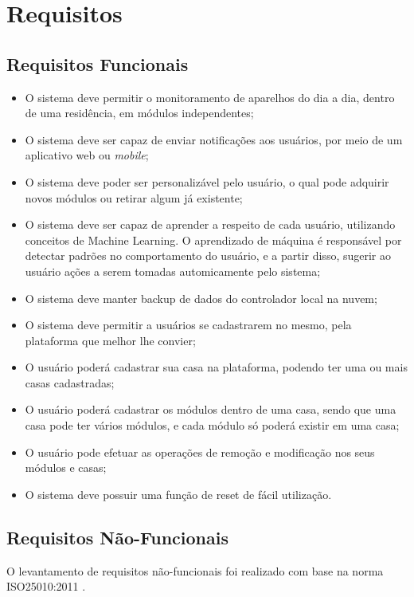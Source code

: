 \section{Requisitos}

\subsection{Requisitos Funcionais}
\begin{itemize}
\item O sistema deve permitir o monitoramento de aparelhos do dia a dia, dentro de uma residência, em módulos independentes;
\item O sistema deve ser capaz de enviar notificações aos usuários, por meio de um aplicativo web ou \textit{mobile};
\item O sistema deve poder ser personalizável pelo usuário, o qual pode adquirir novos módulos ou retirar algum já existente;
\item O sistema deve ser capaz de aprender a respeito de cada usuário, utilizando conceitos de Machine Learning. O aprendizado de máquina é responsável por detectar padrões no comportamento do usuário, e a partir disso, sugerir ao usuário ações a serem tomadas automicamente pelo sistema;
\item O sistema deve manter backup de dados do controlador local na nuvem;
\item O sistema deve permitir a usuários se cadastrarem no mesmo, pela plataforma que melhor lhe convier;
\item O usuário poderá cadastrar sua casa na plataforma, podendo ter uma ou mais casas cadastradas;
\item O usuário poderá cadastrar os módulos dentro de uma casa, sendo que uma casa pode ter vários módulos, e cada módulo só poderá existir em uma casa;
\item O usuário pode efetuar as operações de remoção e modificação nos seus módulos e casas;
\item O sistema deve possuir uma função de reset de fácil utilização.
\end{itemize}

\subsection{Requisitos Não-Funcionais}
O levantamento de requisitos não-funcionais foi realizado com base na norma ISO25010:2011 \cite{iso25010}.

